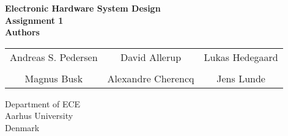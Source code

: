\documentclass[../main.tex]{subfiles}
\begin{document}
\thispagestyle{empty}

\begin{titlepage}
    \begin{center}
        \vspace*{20pt}
        \textbf{\huge{Electronic Hardware System Design}} \\
        \vspace*{20pt}
        \textbf{\large{Assignment 1}} \\
        \vspace*{50pt}
        \textbf{\Large{Authors}} \\
        \vspace{20pt}
        \begin{tabular}{c c c}
            Andreas S. Pedersen & David Allerup & Lukas Hedegaard \\
             && \\
            Magnus Busk & Alexandre Cherencq & Jens Lunde \\
        \end{tabular}

        \vfill
        \vspace*{3cm}
        Department of ECE\\
        Aarhus University\\
        Denmark
    \end{center}
\end{titlepage}
\end{document}
